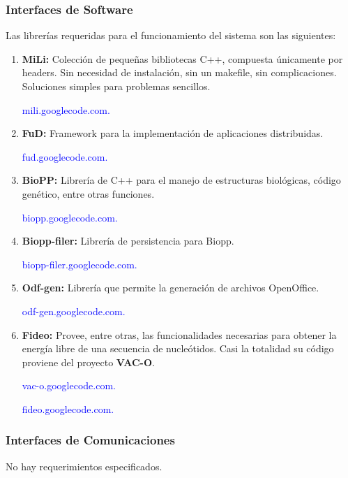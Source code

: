 \documentclass[12pt,a4paper,spanish]{article}
\begin{document}
	\subsubsection{Interfaces de Software}
		\par Las librerías requeridas para el funcionamiento del sistema son las siguientes:
		\begin{enumerate} 		
			\item \textbf{MiLi:} Colección de pequeñas bibliotecas C++, compuesta únicamente por headers. Sin necesidad de instalación, sin un 									makefile, sin complicaciones. Soluciones simples para problemas sencillos.
						\par \noindent \textcolor{blue}{mili.googlecode.com.}

			\item \textbf{FuD:} Framework para la implementación de aplicaciones distribuidas. 
						\par \noindent \textcolor{blue}{fud.googlecode.com.}

			\item \textbf{BioPP:} Librería de C++ para el manejo de estructuras biológicas, código
						genético, entre otras funciones. 
						\par \noindent \textcolor{blue}{biopp.googlecode.com.}

			\item \textbf{Biopp-filer:} Librería de persistencia para Biopp. 
						\par \noindent \textcolor{blue}{biopp-filer.googlecode.com.} 

			\item \textbf{Odf-gen:} Librería que permite la generación de archivos OpenOffice.
						\par \noindent \textcolor{blue}{odf-gen.googlecode.com.}

			\item \textbf{Fideo:} Provee, entre otras, las funcionalidades necesarias para obtener la energía libre de una 									 secuencia de nucleótidos.
								  Casi la totalidad su código proviene del proyecto \textbf{VAC-O}.
						\par \noindent \textcolor{blue}{vac-o.googlecode.com.}
						\par \noindent \textcolor{blue}{fideo.googlecode.com.}  
		\end{enumerate}

	\subsubsection{Interfaces de Comunicaciones}
		No hay requerimientos especificados.
\end{document}
